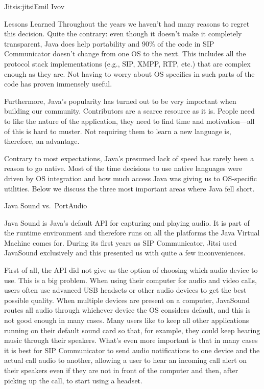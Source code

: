 \begin{aosachapter}{Jitsi}{s:jitsi}{Emil Ivov}
\begin{aosasect1}{Lessons Learned}
Throughout the years we haven't had many reasons to regret this
decision.  Quite the contrary: even though it doesn't make it
completely transparent, Java does help portability and 90\% of the code
in SIP Communicator doesn't change from one OS to the next. This
includes all the protocol stack implementations (e.g.,  SIP, XMPP, RTP,
etc.) that are complex enough as they are. Not having to worry about
OS specifics in such parts of the code has proven immensely useful.

Furthermore, Java's popularity has turned out to be very important
when building our community. Contributors are a scarce resource as it
is.  People need to like the nature of the application, they need to
find time and motivation---all of this is hard to muster. Not
requiring them to learn a new language is, therefore, an advantage.

Contrary to most expectations, Java's presumed lack of speed has
rarely been a reason to go native. Most of the time decisions to use
native languages were driven by OS integration and how much access
Java was giving us to OS-specific utilities.  Below we discuss
the three most important areas where Java fell short.

\begin{aosasect2}{Java Sound vs.\ PortAudio}

Java Sound is Java's default API for capturing and playing audio. It
is part of the runtime environment and therefore runs on all the
platforms the Java Virtual Machine comes for. During its first years
as SIP Communicator, Jitsi used JavaSound exclusively and this
presented us with quite a few inconveniences.

First of all, the API did not give us the option of choosing which
audio device to use. This is a big problem. When using their computer
for audio and video calls, users often use advanced USB headsets or
other audio devices to get the best possible quality. When multiple
devices are present on a computer, JavaSound routes all audio through
whichever device the OS considers default, and this is not good enough
in many cases. Many users like to keep all other applications running
on their default sound card so that, for example, they could keep
hearing music through their speakers. What's even more important is
that in many cases it is best for SIP Communicator to send audio
notifications to one device and the actual call audio to another,
allowing a user to hear an incoming call alert on their speakers even
if they are not in front of the computer and then, after picking up
the call, to start using a headset.


\end{aosasect2}
\end{aosasect1}
\end{aosachapter}
